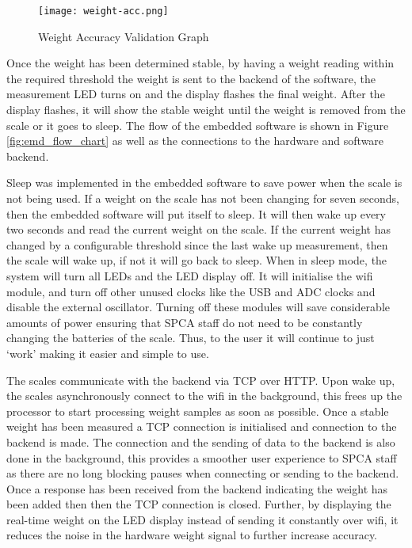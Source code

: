 \begin{figure}[!ht]
	\centering
	\texttt{[image: weight-acc.png]}
	\caption{Weight Accuracy Validation Graph}
	\label{fig:weight_acc}
\end{figure}

Once the weight has been determined stable, by having a weight reading within the required threshold the weight is sent to the backend of the software, the measurement LED turns on and the display flashes the final weight. After the display flashes, it will show the stable weight until the weight is removed from the scale or it goes to sleep. The flow of the embedded software is shown in Figure \ref{fig:emd_flow_chart} as well as the connections to the hardware and software backend.

Sleep was implemented in the embedded software to save power when the scale is not being used. If a weight on the scale has not been changing for seven seconds, then the embedded software will put itself to sleep. It will then wake up every two seconds and read the current weight on the scale. If the current weight has changed by a configurable threshold since the last wake up measurement, then the scale will wake up, if not it will go back to sleep. When in sleep mode, the system will turn all LEDs and the LED display off. It will initialise the wifi module, and turn off other unused clocks like the USB and ADC clocks and disable the external oscillator. Turning off these modules will save considerable amounts of power ensuring that SPCA staff do not need to be constantly changing the batteries of the scale. Thus, to the user it will continue to just ‘work’ making it easier and simple to use. 

The scales communicate with the backend via TCP over HTTP. Upon wake up, the scales asynchronously connect to the wifi in the background, this frees up the processor to start processing weight samples as soon as possible. Once a stable weight has been measured a TCP connection is initialised and connection to the backend is made. The connection and the sending of data to the backend is also done in the background, this provides a smoother user experience to SPCA staff as there are no long blocking pauses when connecting or   sending to the backend. Once a response has been received from the backend indicating the weight has been added then then the TCP connection is closed. Further, by displaying the real-time weight on the LED display instead of sending it constantly over wifi, it reduces the noise in the hardware weight signal to further increase accuracy.

